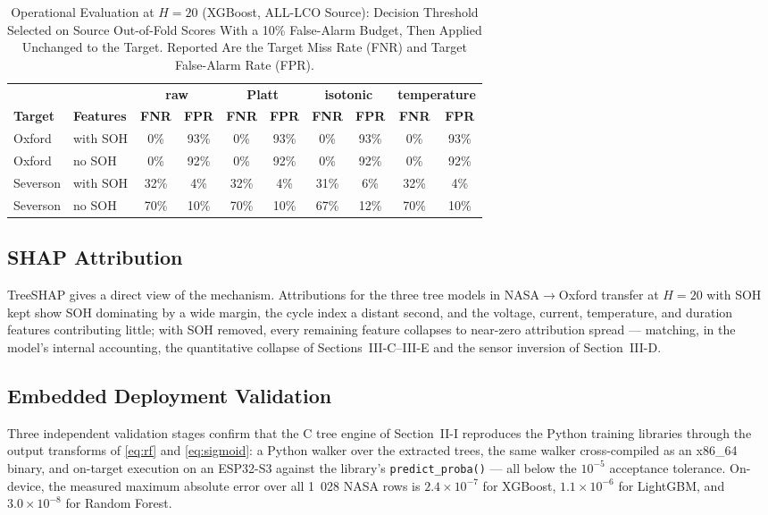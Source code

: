 \begin{table}[!t]
\caption{Operational Evaluation at $H{=}20$ (XGBoost, ALL-LCO Source): Decision Threshold Selected on Source Out-of-Fold Scores With a 10\% False-Alarm Budget, Then Applied Unchanged to the Target. Reported Are the Target Miss Rate (FNR) and Target False-Alarm Rate (FPR).}
\label{tab:oper}
\centering
\scriptsize
\setlength{\tabcolsep}{2.5pt}
\begin{tabular}{llcccccccc}
\toprule
 & & \multicolumn{2}{c}{\textbf{raw}} & \multicolumn{2}{c}{\textbf{Platt}} & \multicolumn{2}{c}{\textbf{isotonic}} & \multicolumn{2}{c}{\textbf{temperature}}\\
\cmidrule(lr){3-4}\cmidrule(l){5-6}\cmidrule(l){7-8}\cmidrule(l){9-10}
\textbf{Target} & \textbf{Features} & \textbf{FNR} & \textbf{FPR} & \textbf{FNR} & \textbf{FPR} & \textbf{FNR} & \textbf{FPR} & \textbf{FNR} & \textbf{FPR}\\
\midrule
Oxford & with SOH & 0\% & 93\% & 0\% & 93\% & 0\% & 93\% & 0\% & 93\% \\
Oxford & no SOH & 0\% & 92\% & 0\% & 92\% & 0\% & 92\% & 0\% & 92\% \\
Severson & with SOH & 32\% & 4\% & 32\% & 4\% & 31\% & 6\% & 32\% & 4\% \\
Severson & no SOH & 70\% & 10\% & 70\% & 10\% & 67\% & 12\% & 70\% & 10\% \\
\bottomrule
\end{tabular}
\end{table}

\subsection{SHAP Attribution}
TreeSHAP \cite{lundberg2020from} gives a direct view of the mechanism. Attributions for the three tree models in NASA$\to$Oxford transfer at $H{=}20$ with SOH kept show SOH dominating by a wide margin, the cycle index a distant second, and the voltage, current, temperature, and duration features contributing little; with SOH removed, every remaining feature collapses to near-zero attribution spread --- matching, in the model's internal accounting, the quantitative collapse of Sections~III-C--III-E and the sensor inversion of Section~III-D.

\subsection{Embedded Deployment Validation}
Three independent validation stages confirm that the C tree engine of Section~II-I reproduces the Python training libraries through the output transforms of \eqref{eq:rf} and \eqref{eq:sigmoid}: a Python walker over the extracted trees, the same walker cross-compiled as an x86\_64 binary, and on-target execution on an ESP32-S3 against the library's \texttt{predict\_proba()} --- all below the $10^{-5}$ acceptance tolerance. On-device, the measured maximum absolute error over all 1~028 NASA rows is $2.4\times10^{-7}$ for XGBoost, $1.1\times10^{-6}$ for LightGBM, and $3.0\times10^{-8}$ for Random Forest.

